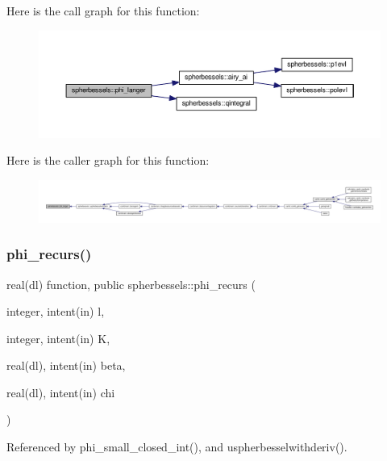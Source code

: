 Here is the call graph for this function\+:
\nopagebreak
\begin{figure}[H]
\begin{center}
\leavevmode
\includegraphics[width=350pt]{namespacespherbessels_ac93cf86caa7e4d63b164799492196aba_cgraph}
\end{center}
\end{figure}
Here is the caller graph for this function\+:
\nopagebreak
\begin{figure}[H]
\begin{center}
\leavevmode
\includegraphics[width=350pt]{namespacespherbessels_ac93cf86caa7e4d63b164799492196aba_icgraph}
\end{center}
\end{figure}
\mbox{\label{namespacespherbessels_ac2bed68bb6862f56c27d5a5cfc5fd94d}} 
\subsubsection{\texorpdfstring{phi\+\_\+recurs()}{phi\_recurs()}}
{\footnotesize\ttfamily real(dl) function, public spherbessels\+::phi\+\_\+recurs (\begin{DoxyParamCaption}\item[{integer, intent(in)}]{l,  }\item[{integer, intent(in)}]{K,  }\item[{real(dl), intent(in)}]{beta,  }\item[{real(dl), intent(in)}]{chi }\end{DoxyParamCaption})}



Referenced by phi\+\_\+small\+\_\+closed\+\_\+int(), and uspherbesselwithderiv().

